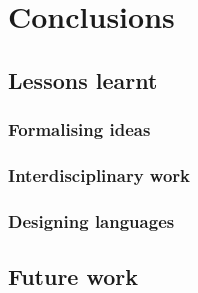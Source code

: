 \chapter{Conclusions}

\section{Lessons learnt}

\subsection{Formalising ideas}

\subsection{Interdisciplinary work}

\subsection{Designing languages}

\section{Future work}
